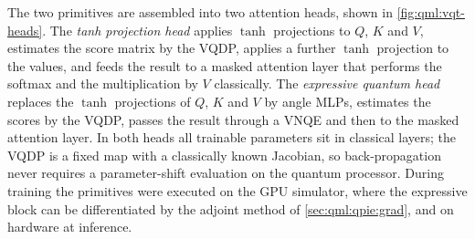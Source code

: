 The two primitives are assembled into two attention heads, shown in \cref{fig:qml:vqt-heads}. The \emph{tanh projection head} applies $\tanh$ projections to $Q$, $K$ and $V$, estimates the score matrix by the VQDP, applies a further $\tanh$ projection to the values, and feeds the result to a masked attention layer that performs the softmax and the multiplication by $V$ classically. The \emph{expressive quantum head} replaces the $\tanh$ projections of $Q$, $K$ and $V$ by angle MLPs, estimates the scores by the VQDP, passes the result through a VNQE and then to the masked attention layer. In both heads all trainable parameters sit in classical layers; the VQDP is a fixed map with a classically known Jacobian, so back-propagation never requires a parameter-shift evaluation on the quantum processor. During training the primitives were executed on the GPU simulator, where the expressive block can be differentiated by the adjoint method of \cref{sec:qml:qpie:grad}, and on hardware at inference.

